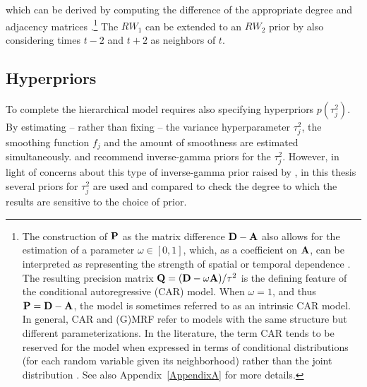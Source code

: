 \noindent which can be derived by computing the difference of the appropriate degree 
and adjacency matrices .\footnote{The construction 
of $\mathbf{P}$ as the matrix difference $\mathbf{D} - \mathbf{A}$ also allows for the estimation 
of a parameter $\omega \in [0,1]$, which, as a coefficient on $\mathbf{A}$, can be 
interpreted as representing the strength of spatial or temporal dependence 
. The resulting precision matrix 
$\mathbf{Q}= (\mathbf{D} - \omega \mathbf{A})/\tau^2$ is the defining feature of the conditional 
autoregressive (CAR) model.  When $\omega = 1$, and thus $\mathbf{P}= \mathbf{D} - \mathbf{A}$, 
the model is sometimes referred to as an intrinsic CAR model. In general, CAR and (G)MRF 
refer to models with the same structure but different parameterizations. In the literature, the 
term CAR tends to be reserved for the model when expressed in terms of conditional 
distributions (for each random variable given its neighborhood) rather than the joint distribution . 
See also Appendix~\ref{AppendixA} for more details.\label{footnote_car}} 
The $RW_1$ can be extended to an $RW_2$ prior by also considering  
times $t-2$ and $t+2$ as neighbors of $t$. 


\subsection{Hyperpriors}
\label{hyperpriors}

To complete the hierarchical model requires also specifying hyperpriors $p(\tau_j^2)$.  
By estimating -- rather than fixing -- the variance hyperparameter $\tau_j^2$, the smoothing function $f_j$ 
and the amount of smoothness are estimated simultaneously. 
  and  recommend  
 inverse-gamma priors for the $\tau_j^2$. However, in light of concerns about this type 
 of inverse-gamma prior raised by , in this thesis several priors 
 for $\tau^2_j$ are used and compared to check the degree to which the results are 
 sensitive to the choice of prior.

